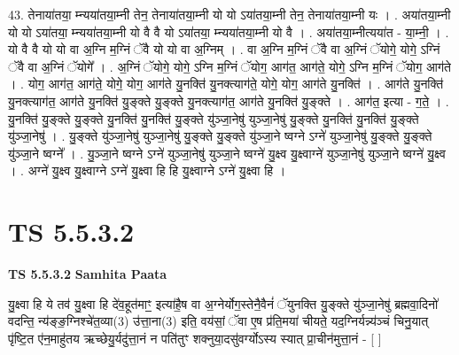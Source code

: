 \documentclass[17pt]{extarticle}
\begin{document}
43. तेनाया॑तया॒ म्न्यया॑तया॒म्नी तेन॒ तेनाया॑तया॒म्नी यो यो ऽया॑तया॒म्नी तेन॒ तेनाया॑तया॒म्नी यः । . अया॑तया॒म्नी यो यो ऽया॑तया॒ म्न्यया॑तया॒म्नी यो वै वै यो ऽया॑तया॒ म्न्यया॑तया॒म्नी यो वै । . अया॑तया॒म्नीत्यया॑त - या॒म्नी॒ । . यो वै वै यो यो वा अ॒ग्नि म॒ग्निं ॅवै यो यो वा अ॒ग्निम् । . वा अ॒ग्नि म॒ग्निं ॅवै वा अ॒ग्निं ॅयोगे॒ योगे॒ ऽग्निं ॅवै वा अ॒ग्निं ॅयोगे᳚ । . अ॒ग्निं ॅयोगे॒ योगे॒ ऽग्नि म॒ग्निं ॅयोग॒ आग॑त॒ आग॑ते॒ योगे॒ ऽग्नि म॒ग्निं ॅयोग॒ आग॑ते । . योग॒ आग॑त॒ आग॑ते॒ योगे॒ योग॒ आग॑ते यु॒नक्ति॑ यु॒नक्त्याग॑ते॒ योगे॒ योग॒ आग॑ते यु॒नक्ति॑ । . आग॑ते यु॒नक्ति॑ यु॒नक्त्याग॑त॒ आग॑ते यु॒नक्ति॑ यु॒ङ्क्ते यु॒ङ्क्ते यु॒नक्त्याग॑त॒ आग॑ते यु॒नक्ति॑ यु॒ङ्क्ते । . आग॑त॒ इत्या - ग॒ते॒ । . यु॒नक्ति॑ यु॒ङ्क्ते यु॒ङ्क्ते यु॒नक्ति॑ यु॒नक्ति॑ यु॒ङ्क्ते यु॑ञ्जा॒नेषु॑ युञ्जा॒नेषु॑ यु॒ङ्क्ते यु॒नक्ति॑ यु॒नक्ति॑ यु॒ङ्क्ते यु॑ञ्जा॒नेषु॑ । . यु॒ङ्क्ते यु॑ञ्जा॒नेषु॑ युञ्जा॒नेषु॑ यु॒ङ्क्ते यु॒ङ्क्ते यु॑ञ्जा॒ने ष्वग्ने ऽग्ने॑ युञ्जा॒नेषु॑ यु॒ङ्क्ते यु॒ङ्क्ते यु॑ञ्जा॒ने ष्वग्ने᳚ । . यु॒ञ्जा॒ने ष्वग्ने ऽग्ने॑ युञ्जा॒नेषु॑ युञ्जा॒ने ष्वग्ने॑ यु॒क्ष्व यु॒क्ष्वाग्ने॑ युञ्जा॒नेषु॑ युञ्जा॒ने ष्वग्ने॑ यु॒क्ष्व । . अग्ने॑ यु॒क्ष्व यु॒क्ष्वाग्ने ऽग्ने॑ यु॒क्ष्वा हि हि यु॒क्ष्वाग्ने ऽग्ने॑ यु॒क्ष्वा हि । \newline
\pagebreak
{}

\section{ TS 5.5.3.2 }

\textbf{TS 5.5.3.2 } \newline
\textbf{Samhita Paata} \newline

यु॒क्ष्वा हि ये तव॑ यु॒क्ष्वा हि दे॑व॒हूत॑माꣳ॒॒ इत्या॑है॒ष वा अ॒ग्नेर्योग॒स्तेनै॒वैनं॑ ॅयुनक्ति यु॒ङ्क्ते यु॑ञ्जा॒नेषु॑ ब्रह्मवा॒दिनो॑ वदन्ति॒ न्य॑ङ्ङ॒ग्निश्चे॑त॒व्या(3) उ॑त्ता॒ना(3) इति॒ वय॑सां॒ ॅवा ए॒ष प्र॑ति॒मया॑ चीयते॒ यद॒ग्निर्यन्न्य॑ञ्चं चिनु॒यात् पृ॑ष्टि॒त ए॑न॒माहु॑तय ऋच्छेयु॒र्यदु॑त्ता॒नं न पति॑तुꣳ शक्नुया॒दसु॑वर्ग्योऽस्य स्यात् प्रा॒चीन॑मुत्ता॒नं - [  ] \newline
\end{document}
